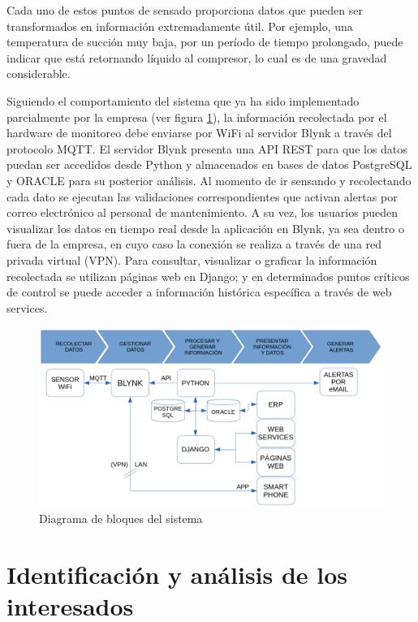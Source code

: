 \documentclass[
11pt, %
]{charter}
\begin{document}
Cada uno de estos puntos de sensado proporciona datos que pueden ser transformados en información extremadamente útil. Por ejemplo, una temperatura de succión muy baja, por un período de tiempo prolongado, puede indicar que está retornando líquido al compresor, lo cual es de una gravedad considerable.

Siguiendo el comportamiento del sistema que ya ha sido implementado parcialmente por la empresa (ver figura \ref{fig:diagramabloques}), la información recolectada por el hardware de monitoreo debe enviarse por WiFi al servidor Blynk a través del protocolo MQTT. El servidor Blynk presenta una API REST para que los datos puedan ser accedidos desde Python y almacenados en bases de datos PostgreSQL y ORACLE para su posterior análisis. Al momento de ir sensando y recolectando cada dato se ejecutan las validaciones correspondientes que activan alertas por correo electrónico al personal de mantenimiento. A su vez, los usuarios pueden visualizar los datos en tiempo real desde la aplicación en Blynk, ya sea dentro o fuera de la empresa, en cuyo caso la conexión se realiza a través de una red privada virtual (VPN). Para consultar, visualizar o graficar la información recolectada se utilizan páginas web en Django; y en determinados puntos críticos de control se puede acceder a información histórica específica a través de web services.

\begin{figure}[htpb]
\centering 
\includegraphics[width=.9\textwidth]{./Figuras/diagramabloques.png}
\caption{Diagrama de bloques del sistema}
\label{fig:diagramabloques}
\end{figure}

\section{Identificación y análisis de los interesados}
\label{sec:interesados}
\end{document}

